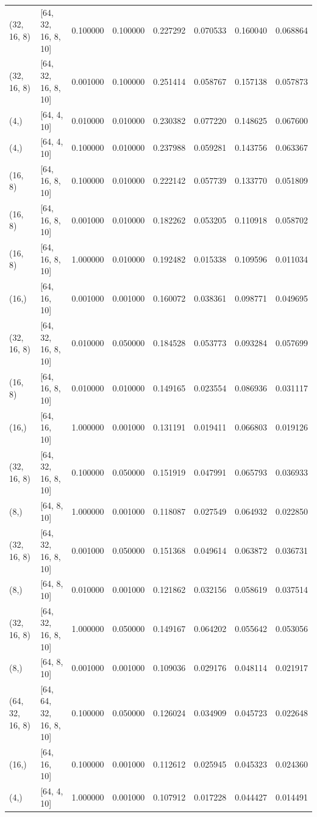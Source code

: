 \documentclass{article}
\begin{document}
\begin{longtable}{llrrrrrr}
(32, 16, 8) & [64, 32, 16, 8, 10] & 0.100000 & 0.100000 & 0.227292 & 0.070533 & 0.160040 & 0.068864 \\
(32, 16, 8) & [64, 32, 16, 8, 10] & 0.001000 & 0.100000 & 0.251414 & 0.058767 & 0.157138 & 0.057873 \\
(4,) & [64, 4, 10] & 0.010000 & 0.010000 & 0.230382 & 0.077220 & 0.148625 & 0.067600 \\
(4,) & [64, 4, 10] & 0.100000 & 0.010000 & 0.237988 & 0.059281 & 0.143756 & 0.063367 \\
(16, 8) & [64, 16, 8, 10] & 0.100000 & 0.010000 & 0.222142 & 0.057739 & 0.133770 & 0.051809 \\
(16, 8) & [64, 16, 8, 10] & 0.001000 & 0.010000 & 0.182262 & 0.053205 & 0.110918 & 0.058702 \\
(16, 8) & [64, 16, 8, 10] & 1.000000 & 0.010000 & 0.192482 & 0.015338 & 0.109596 & 0.011034 \\
(16,) & [64, 16, 10] & 0.001000 & 0.001000 & 0.160072 & 0.038361 & 0.098771 & 0.049695 \\
(32, 16, 8) & [64, 32, 16, 8, 10] & 0.010000 & 0.050000 & 0.184528 & 0.053773 & 0.093284 & 0.057699 \\
(16, 8) & [64, 16, 8, 10] & 0.010000 & 0.010000 & 0.149165 & 0.023554 & 0.086936 & 0.031117 \\
(16,) & [64, 16, 10] & 1.000000 & 0.001000 & 0.131191 & 0.019411 & 0.066803 & 0.019126 \\
(32, 16, 8) & [64, 32, 16, 8, 10] & 0.100000 & 0.050000 & 0.151919 & 0.047991 & 0.065793 & 0.036933 \\
(8,) & [64, 8, 10] & 1.000000 & 0.001000 & 0.118087 & 0.027549 & 0.064932 & 0.022850 \\
(32, 16, 8) & [64, 32, 16, 8, 10] & 0.001000 & 0.050000 & 0.151368 & 0.049614 & 0.063872 & 0.036731 \\
(8,) & [64, 8, 10] & 0.010000 & 0.001000 & 0.121862 & 0.032156 & 0.058619 & 0.037514 \\
(32, 16, 8) & [64, 32, 16, 8, 10] & 1.000000 & 0.050000 & 0.149167 & 0.064202 & 0.055642 & 0.053056 \\
(8,) & [64, 8, 10] & 0.001000 & 0.001000 & 0.109036 & 0.029176 & 0.048114 & 0.021917 \\
(64, 32, 16, 8) & [64, 64, 32, 16, 8, 10] & 0.100000 & 0.050000 & 0.126024 & 0.034909 & 0.045723 & 0.022648 \\
(16,) & [64, 16, 10] & 0.100000 & 0.001000 & 0.112612 & 0.025945 & 0.045323 & 0.024360 \\
(4,) & [64, 4, 10] & 1.000000 & 0.001000 & 0.107912 & 0.017228 & 0.044427 & 0.014491 \\

\end{longtable}
\end{document}
